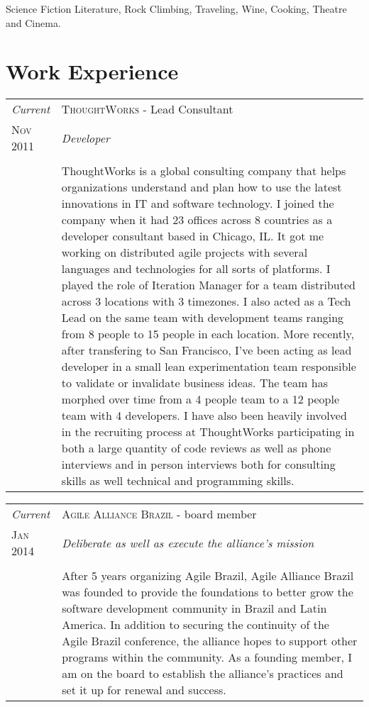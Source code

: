 \documentclass[letter,10pt]{article}
\begin{document}
Science Fiction Literature, Rock Climbing, Traveling, Wine, Cooking, Theatre and Cinema.

\section{Work Experience}

\begin{tabular}{p{2.5cm}|p{13.5cm}}
  \emph{Current} & \textsc{ThoughtWorks} - Lead Consultant\\
  \textsc{Nov 2011}& \emph{Developer}\\
  &\\
  &ThoughtWorks is a global consulting company that helps organizations understand and plan how to use the latest innovations in IT and software technology. I joined the company when it had 23 offices across 8 countries as a developer consultant based in Chicago, IL. It got me working on distributed agile projects with several languages and technologies for all sorts of platforms. I played the role of Iteration Manager for a team distributed across 3 locations with 3 timezones. I also acted as a Tech Lead on the same team with development teams ranging from 8 people to 15 people in each location. More recently, after transfering to San Francisco, I've been acting as lead developer in a small lean experimentation team responsible to validate or invalidate business ideas. The team has morphed over time from a 4 people team to a 12 people team with 4 developers. I have also been heavily involved in the recruiting process at ThoughtWorks participating in both a large quantity of code reviews as well as phone interviews and in person interviews both for consulting skills as well technical and programming skills.
\end{tabular}

\begin{tabular}{p{2.5cm}|p{13.5cm}}
  \emph{Current} & \textsc{Agile Alliance Brazil} - board member\\
  \textsc{Jan 2014}& \emph{Deliberate as well as execute the alliance's mission}\\
  &\\
  & After 5 years organizing Agile Brazil, Agile Alliance Brazil
  was founded to provide the foundations to better grow the software
  development community in Brazil and Latin America. In addition to
  securing the continuity of the Agile Brazil conference, the alliance
  hopes to support other programs within the community. As a founding
  member, I am on the board to establish the alliance's practices
  and set it up for renewal and success.
\end{tabular}
\end{document}
